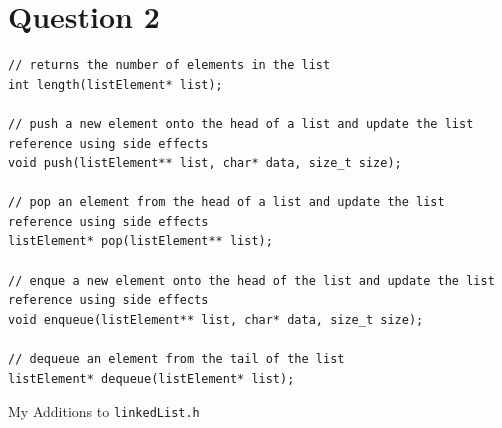 \documentclass[a4paper]{article}
\newenvironment{code}{\captionsetup{type=listing, skip=0pt}}{}
\begin{document}
\section{Question 2}
\begin{code}
\begin{verbatim}
// returns the number of elements in the list
int length(listElement* list);

// push a new element onto the head of a list and update the list reference using side effects
void push(listElement** list, char* data, size_t size);

// pop an element from the head of a list and update the list reference using side effects
listElement* pop(listElement** list);

// enque a new element onto the head of the list and update the list reference using side effects
void enqueue(listElement** list, char* data, size_t size);  

// dequeue an element from the tail of the list  
listElement* dequeue(listElement* list);  
\end{verbatim}
\caption{My Additions to \texttt{linkedList.h}}
\end{code}
\end{document}
